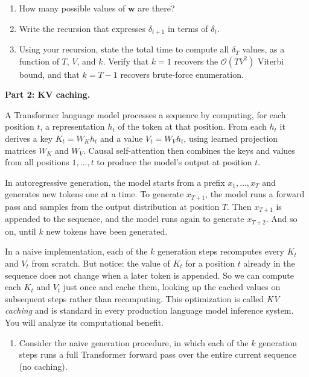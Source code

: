 \documentclass[submit]{harvardml}
\begin{document}
\begin{framed}
\begin{enumerate}
  \begin{enumerate}
    \item[(i)] How many possible values of $\mathbf{w}$ are there?
    \item[(ii)] Write the recursion that expresses $\delta_{t+1}$ in terms of $\delta_t$.
    \item[(iii)] Using your recursion, state the total time to compute all $\delta_T$ values, as a function of $T$, $V$, and $k$. Verify that $k = 1$ recovers the $\mathcal{O}(TV^2)$ Viterbi bound, and that $k = T-1$ recovers brute-force enumeration.
  \end{enumerate}
\end{enumerate}
\end{framed}

\newpage

\begin{framed}
\noindent \textbf{Part 2: KV caching.}

\noindent A Transformer language model processes a sequence by computing, for each position $t$, a representation $h_t$ of the token at that position. From each $h_t$ it derives a key $K_t = W_K h_t$ and a value $V_t = W_V h_t$, using learned projection matrices $W_K$ and $W_V$. Causal self-attention then combines the keys and values from all positions $1, \ldots, t$ to produce the model's output at position $t$.

In autoregressive generation, the model starts from a prefix $x_1, \ldots, x_T$ and generates new tokens one at a time. To generate $x_{T+1}$, the model runs a forward pass and samples from the output distribution at position $T$. Then $x_{T+1}$ is appended to the sequence, and the model runs again to generate $x_{T+2}$. And so on, until $k$ new tokens have been generated.

In a naive implementation, each of the $k$ generation steps recomputes every $K_t$ and $V_t$ from scratch. But notice: the value of $K_t$ for a position $t$ already in the sequence does not change when a later token is appended. So we can compute each $K_t$ and $V_t$ just once and cache them, looking up the cached values on subsequent steps rather than recomputing. This optimization is called \emph{KV caching} and is standard in every production language model inference system. You will analyze its computational benefit.

\begin{enumerate}
  \item[2a.] Consider the naive generation procedure, in which each of the $k$ generation steps runs a full Transformer forward pass over the entire current sequence (no caching).
  

\end{enumerate}
\end{framed}
\end{document}
